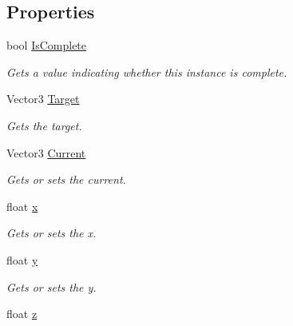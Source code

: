 \subsection*{Properties}
\begin{DoxyCompactItemize}
\item 
bool \hyperlink{class_radical_library_1_1_smooth_vector3_ac0e49009ea614c37602e2a7f0ca32240}{Is\+Complete}
\begin{DoxyCompactList}\small\item\em Gets a value indicating whether this instance is complete. \end{DoxyCompactList}\item 
Vector3 \hyperlink{class_radical_library_1_1_smooth_vector3_ae6e1a0824db52df7aa5a66c0c0465a01}{Target}
\begin{DoxyCompactList}\small\item\em Gets the target. \end{DoxyCompactList}\item 
Vector3 \hyperlink{class_radical_library_1_1_smooth_vector3_aba5ed506be16cf21472bd9921702cd5d}{Current}
\begin{DoxyCompactList}\small\item\em Gets or sets the current. \end{DoxyCompactList}\item 
float \hyperlink{class_radical_library_1_1_smooth_vector3_aabe4b65f544a412a094492a045056b74}{x}
\begin{DoxyCompactList}\small\item\em Gets or sets the x. \end{DoxyCompactList}\item 
float \hyperlink{class_radical_library_1_1_smooth_vector3_ac744758c88420820e1839ada11ae60ac}{y}
\begin{DoxyCompactList}\small\item\em Gets or sets the y. \end{DoxyCompactList}\item 
float \hyperlink{class_radical_library_1_1_smooth_vector3_accb3594d643d55a1edfde5c957602914}{z}

\end{DoxyCompactItemize}
